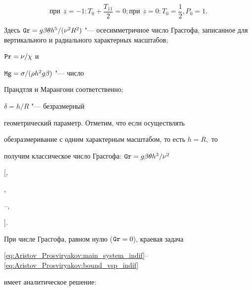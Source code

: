 \begin{equation}

\text{при} \ \ z=-1: T_0+\frac{T_{11}}{2}=0; \text{при} \ \ z=0:

T_0=\frac{1}{2}, P_0=1.

\label{eq:Aristov_Prosviryakov:bound_vsp_indif}

\end{equation}

Здесь ${\tt Gr}={g\beta\theta h^5}/({\nu^2 R^2})$ "--- осесимметричное число Грасгофа, записанное для вертикального и радиального характерных масштабов; 

${\tt Pr}={\nu}/{\chi}$ и 

${\tt Mg}={\sigma}/({\rho h^2 g\beta})$ "--- число

Прандтля и Марангони соответственно;

$\delta={h}/{R}$  "--- безразмерный

геометрический параметр.  Отметим, что если осуществлять

обезразмеривание с одним характерным масштабом, то есть $h=R,$ то

получим классическое число Грасгофа: ${\tt Gr}={g\beta\theta h^3}/{\nu^2}$

[,

,

--,

].



При числе Грасгофа, равном нулю (${\tt Gr}=0$), краевая задача

\eqref{eq:Aristov_Prosviryakov:main_system_indif}--\eqref{eq:Aristov_Prosviryakov:bound_vsp_indif}

имеет аналитическое решение:


